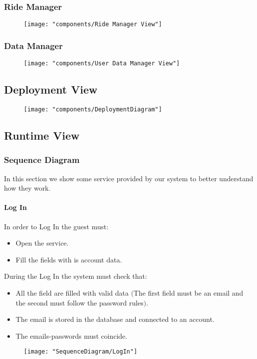 	\subsubsection{Ride Manager}
		\begin{figure}[h!]
			\centering
			\texttt{[image: "components/Ride Manager View"]}
		\end{figure}

	\subsubsection{Data Manager}
		\begin{figure}[h!]
			\centering
			\texttt{[image: "components/User Data Manager View"]}
		\end{figure}



\subsection{Deployment View}
	\begin{figure}[h!]
			\centering
			\texttt{[image: "components/DeploymentDiagram"]}
	\end{figure}

\newpage

\subsection{Runtime View}
	\subsubsection{Sequence Diagram}
	In this section we show some service provided by our system to better understand how they work.
			\paragraph{Log In}
			In order to Log In the guest must: \begin{itemize}
				\item Open the service.
				\item Fill the fields with is account data.
			\end{itemize}
			During the Log In the system must check that:\begin{itemize}
				\item All the field are filled with valid data $($The first field must be an email and the second must follow the password rules$)$.
				\item The email is stored in the database and connected to an account.
				\item The emails-passwords must coincide.
			\end{itemize}
			\newpage
			\begin{figure}[h!]
				\centering
				\texttt{[image: "SequenceDiagram/LogIn"]}
			\end{figure}
			\newpage

